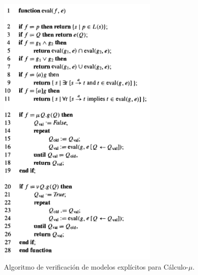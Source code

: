 \begin{figure}[h!]
  \centering
  \includegraphics[width=0.7\textwidth]{Figures/eval.png}
  \caption{Algoritmo de verificación de modelos explícitos para Cálculo-$\mu$.} 
  \label{fig:eval1}
\end{figure}
